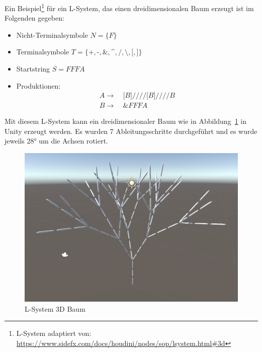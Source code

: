 Ein Beispiel\footnote{L-System adaptiert von: \url{https://www.sidefx.com/docs/houdini/nodes/sop/lsystem.html\#3d}} für ein L-System, das einen dreidimensionalen Baum erzeugt ist im Folgenden gegeben:
\begin{itemize}
    \item Nicht-Terminalsymbole $N=\{F\}$
    \item Terminalsymbole $T=\{\texttt{+},\texttt{-},\texttt{\&},\texttt{\textasciicircum},\texttt{/},\texttt{\textbackslash},\texttt{[},\texttt{]}\}$
    \item Startstring $S=FFFA$
    \item Produktionen:
    \begin{align*}
        A\rightarrow &~\texttt{[}B\texttt{]////[}B\texttt{]////}B \\
        B\rightarrow &~\texttt{\&}FFFA
    \end{align*}
\end{itemize}

Mit diesem L-System kann ein dreidimensionaler Baum wie in Abbildung~\ref{fig:L-System 3D Unity} in Unity erzeugt werden.
Es wurden 7 Ableitungsschritte durchgeführt und es wurde jeweils \ang{28} um die Achsen rotiert.

\begin{figure}[ht]
    \centering
        
    \includegraphics[width=0.5\linewidth]{chapters/02_Grundlagen/L_System/L_System_3D_Tree.png}
    \caption{L-System 3D Baum}\label{fig:L-System 3D Unity}
\end{figure}


